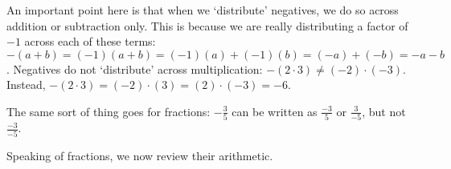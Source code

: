 \medskip

An important point here is that when we `distribute' negatives, we do so across addition or subtraction only.  This is because we are really distributing a factor of $-1$ across each of these terms:  $-(a+b) = (-1)(a+b) = (-1)(a) + (-1)(b) = (-a)+(-b) = -a-b$. Negatives do not `distribute' across multiplication:  $- (2 \cdot 3) \neq (-2)\cdot(-3)$. Instead, $-(2\cdot 3) = (-2)\cdot (3) = (2) \cdot (-3) = -6$.  

\medskip

The same sort of thing goes for fractions:  $- \frac{3}{5}$ can be written as $\frac{-3}{5}$ or $\frac{3}{-5}$, but not $\frac{-3}{-5}$.  


Speaking of fractions, we now review their arithmetic.

\smallskip

\label{fractionarithmetic}

